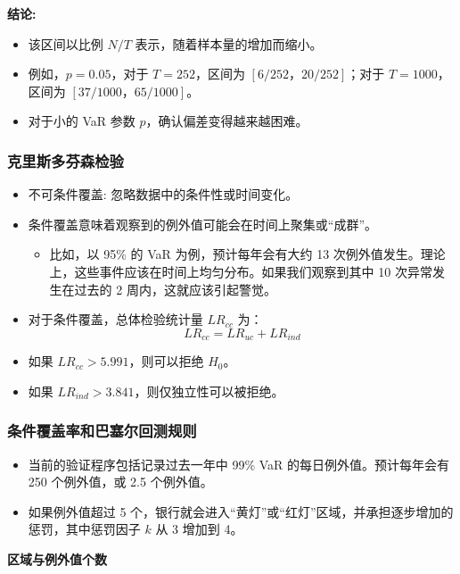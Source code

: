     \textbf{结论:}
    \begin{itemize}
        \item 该区间以比例 \( N/T \) 表示，随着样本量的增加而缩小。
        \item 例如，\( p = 0.05 \)，对于 \( T = 252 \)，区间为 \( [6/252， 20/252] \)；对于 \( T = 1000 \)，区间为 \( [37/1000， 65/1000] \)。
        \item 对于小的 VaR 参数 \( p \)，确认偏差变得越来越困难。
    \end{itemize}
\subsubsection{克里斯多芬森检验}
    \begin{itemize}
        \item 不可条件覆盖: 忽略数据中的条件性或时间变化。
        \item 条件覆盖意味着观察到的例外值可能会在时间上聚集或“成群”。
        \begin{itemize}
            \item 比如，以 95\% 的 VaR 为例，预计每年会有大约 13 次例外值发生。理论上，这些事件应该在时间上均匀分布。如果我们观察到其中 10 次异常发生在过去的 2 周内，这就应该引起警觉。
        \end{itemize}
        \item 对于条件覆盖，总体检验统计量 \( LR_{cc} \) 为：
        \[
        LR_{cc} = LR_{uc} + LR_{ind}
        \]
        \item 如果 \( LR_{cc} > 5.991 \)，则可以拒绝 \( H_0 \)。
        \item 如果 \( LR_{ind} > 3.841 \)，则仅独立性可以被拒绝。
    \end{itemize}


\subsubsection{条件覆盖率和巴塞尔回测规则}



\begin{itemize}
    \item 当前的验证程序包括记录过去一年中 99\% VaR 的每日例外值。预计每年会有 250 个例外值，或 2.5 个例外值。
    \item 如果例外值超过 5 个，银行就会进入“黄灯”或“红灯”区域，并承担逐步增加的惩罚，其中惩罚因子 \( k \) 从 3 增加到 4。
\end{itemize}

\textbf{区域与例外值个数}


